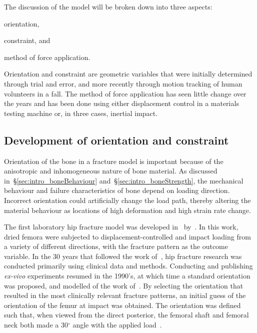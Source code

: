 The discussion of the model will be broken down into three aspects:	
\begin{inparaenum}[(i)]
	\item \label{itm:orient} orientation,
	\item \label{itm:constrain} constraint, and
	\item \label{itm:method} method of force application.
\end{inparaenum}

Orientation and constraint are geometric variables that were initially determined through trial and error, and more recently through motion tracking of human volunteers in a fall.
The method of force application has seen little change over the years and has been done using either displacement control in a materials testing machine or, in three cases, inertial impact.

\subsection{Development of orientation and constraint}
\label{sec:intro_understanding_modelling_lab_orient_constraint}
Orientation of the bone in a fracture model is important because of the anisotropic and inhomogeneous nature of bone material.
As discussed in~\S\ref{sec:intro_boneBehaviour} and~\S\ref{sec:intro_boneStrength}, the mechanical behaviour and failure characteristics of bone depend on loading direction.
Incorrect orientation could artificially change the load path, thereby altering the material behaviour as locations of high deformation and high strain rate change.

The first laboratory hip fracture model was developed in~\citeyear{backman_proximal_1957} by~\citet{backman_proximal_1957}.
In this work, dried femora were subjected to displacement-controlled and impact loading from a variety of different directions, with the fracture pattern as the outcome variable.
In the 30 years that followed the work of~\citet{backman_proximal_1957}, hip fracture research was conducted primarily using clinical data and methods.
Conducting and publishing \textit{ex-vivo} experiments resumed in the 1990's, at which time a standard orientation was proposed, and modelled of the work of~\citet{backman_proximal_1957}.
By selecting the orientation that resulted in the most clinically relevant fracture patterns, an initial guess of the orientation of the femur at impact was obtained.
The orientation was defined such that, when viewed from the direct posterior, the femoral shaft and femoral neck both made a 30$^\circ$ angle with the applied load~\citep{lotz_use_1990}.

